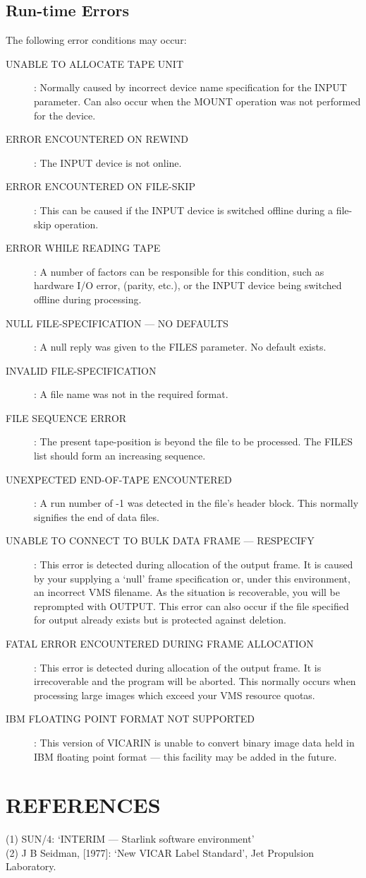 \subsection {Run-time Errors}
The following error conditions may occur:
\begin{description}
\item[UNABLE TO ALLOCATE TAPE UNIT]:
Normally caused by incorrect device name specification for the INPUT parameter.
Can also occur when the MOUNT operation was not performed for the device.
\item[ERROR ENCOUNTERED ON REWIND]:
The INPUT device is not online.
\item[ERROR ENCOUNTERED ON FILE-SKIP]:
This can be caused if the INPUT device is switched offline during a file-skip
operation.
\item[ERROR WHILE READING TAPE]:
A number of factors can be responsible for this condition, such as hardware I/O
error, (parity, etc.), or the INPUT device being switched offline during
processing.
\item[NULL FILE-SPECIFICATION --- NO DEFAULTS]:
A null reply was given to the FILES parameter.
No default exists.
\item[INVALID FILE-SPECIFICATION]:
A file name was not in the required format.
\item[FILE SEQUENCE ERROR]:
The present tape-position is beyond the file to be processed.
The FILES list should form an increasing sequence.
\item[UNEXPECTED END-OF-TAPE ENCOUNTERED]:
A run number of -1 was detected in the file's header block.
This normally signifies the end of data files.
\item[UNABLE TO CONNECT TO BULK DATA FRAME --- RESPECIFY]:
This error is detected during allocation of the output frame.
It is caused by your supplying a `null' frame specification or, under this
environment, an incorrect VMS filename.
As the situation is recoverable, you will be reprompted with OUTPUT.
This error can also occur if the file specified for output already exists but is
protected against deletion.
\item[FATAL ERROR ENCOUNTERED DURING FRAME ALLOCATION]:
This error is detected during allocation of the output frame.
It is irrecoverable and the program will be aborted.
This normally occurs when processing large images which exceed your VMS resource
quotas.
\item[IBM FLOATING POINT FORMAT NOT SUPPORTED]:
This version of VICARIN is unable to convert binary image data held in IBM
floating point format --- this facility may be added in the future.
\end{description}
\section {REFERENCES}
(1) SUN/4: `INTERIM --- Starlink software environment'\\
(2) J B Seidman, [1977]: `New VICAR Label Standard', Jet Propulsion Laboratory.

